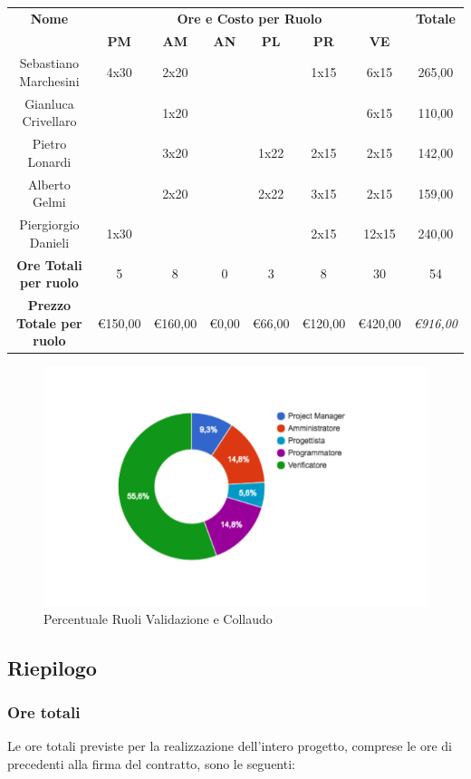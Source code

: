\documentclass[12pt,a4paper,titlepage]{article}
\begin{document}
	{\renewcommand\arraystretch{1.2} %
		\small
		\begin{tabular}{|c|c|c|c|c|c|c|c|}
			\hline 
			\textbf{Nome} & \multicolumn{6}{c|}{\textbf{Ore e Costo per Ruolo}} & \textbf{Totale} \\ 
			& \textbf{PM} & \textbf{AM} & \textbf{AN} & \textbf{PL} & \textbf{PR} & \textbf{VE} & \textbf{} \\ 
			\hline
			Sebastiano Marchesini & 4x30 & 2x20 & & & 1x15 & 6x15 & 265,00 \\ 
			\hline 
			Gianluca Crivellaro & & 1x20 & & & & 6x15 & 110,00 \\ 
			\hline 
			Pietro Lonardi & & 3x20 & & 1x22 & 2x15 & 2x15 & 142,00 \\ 
			\hline 
			Alberto Gelmi & & 2x20 & & 2x22 & 3x15 & 2x15 & 159,00 \\ 
			\hline 
			Piergiorgio Danieli & 1x30 & & & & 2x15 & 12x15 & 240,00 \\ 
			\hline
			\hline
			\textbf{Ore Totali per ruolo} & 5 & 8 & 0 & 3 & 8 & 30 & 54 \\  
			\textbf{Prezzo Totale per ruolo}&\euro 150,00&\euro  160,00&\euro 0,00&\euro 66,00&\euro 120,00&\euro 420,00& \textit{\euro 916,00} \\  
			\hline
	\end{tabular}}

	\begin{figure}[p]
		\centering
		\includegraphics[width=0.7\linewidth]{"CiambellaValidazioneCollaudo"}
		\caption{Percentuale Ruoli Validazione e Collaudo}
		\label{fig:ciambella-validazione-collaudo}
	\end{figure} 


	
	\subsection{Riepilogo}
	\subsubsection{Ore totali}
	Le ore totali previste per la realizzazione dell'intero progetto, comprese le ore di precedenti alla firma del contratto, sono le seguenti: \\
	
\end{document}
